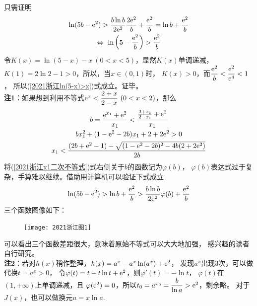 \begin{enumerate}[label={【\textbf{例\thechapter.\arabic*}】},
 leftmargin=\inteval{\myenumleftmargin}pt,
 itemsep=\inteval{\myenumitempsep}pt,
 itemindent=\inteval{\myenumitemindent}pt]
只需证明
\begin{gather}
    \ln(5b-\e^2)>\dfrac{b\ln b}{2\e^{2}}\dfrac{2\e^2}{b}
    +\dfrac{\e^{2}}{b}=\ln b+\dfrac{\e^{2}}{b} \nonumber \\
    \Leftrightarrow\ 
    \ln\left(5-\dfrac{\e^{2}}{b}\right)>\dfrac{\e^{2}}{b}
    \label{2021浙江ln(5-x)>x}
\end{gather}
令$ K(x)=\ln(5-x)-x\ (0<x<5) $，显然$ K(x) $单调递减，
$ K(1)=2\ln 2-1>0 $，所以，当$ x\in(0,1) $时，
$ K(x)>0 $，而$ \dfrac{\mathrm{e}^{2}}{b}<\dfrac{\mathrm{e}^{2}}{\mathrm{e}^4}<1 $，
所以(\ref{2021浙江ln(5-x)>x})式成立。证毕。\\
\textbf{注1}：如果想到利用不等式$ \e^x<\dfrac{2+x}{2-x}\ (0<x<2) $，那么
\begin{gather}
    b=\dfrac{\mathrm{e}^{x_1}+\mathrm{e}^2}{x_1}<\dfrac{\frac{2+x_1}{2-x_1}+\mathrm{e}^2}{x_1}
    \nonumber \\
    bx_1^2+(1-\mathrm{e}^2-2b)x_1+2+2\mathrm{e}^2>0 \nonumber \\
    x_1<\dfrac{(2b+\mathrm{e}^2-1)-\sqrt{(1-\mathrm{e}^2-2b)^2-4b(2+2\mathrm{e}^2)}}{2b} 
    \label{2021浙江x1二次不等式}
\end{gather}
将(\ref{2021浙江x1二次不等式})式右侧关于$ b $的函数记为$ \varphi(b) $，
$ \varphi(b) $表达式过于复杂，手算难以继续。借助用计算机可以验证下式成立
\begin{gather*}
    \ln(5b-\mathrm{e}^2)>\ln b+\dfrac{\mathrm{e}^{2}}{b}
    >\dfrac{b\ln b}{2\mathrm{e}^{2}}\varphi(b)+\dfrac{\mathrm{e}^{2}}{b}
\end{gather*}
三个函数图像如下：
\begin{figure}[!ht] %
    \centering
    \texttt{[image: 2021浙江图1]}
\end{figure}

可以看出三个函数差距很大，意味着原始不等式可以大大地加强，
感兴趣的读者自行研究。\\
\textbf{注2}：若对$ h(x) $稍作整理，$ h(x)=a^x-a^x\ln(a^x)+\mathrm{e}^2 $，
发现$ a^x $出现3次，可以做代换$ t=a^x>0 $，
令$ \varphi(t)=t-t\ln t+\mathrm{e}^2 $，则$ \varphi'(t)=-\ln t $，
$ \varphi(t) $在$ (1,+\infty) $上单调递减，且
$ \varphi(\mathrm{e}^2)=0 $，所以$ t_0=a^{x_0}=\dfrac{b}{\ln a}>\mathrm{e}^2 $，剩余略。
对于$ J(x) $，也可以做换元$ u=x\ln a $.


\end{enumerate}
